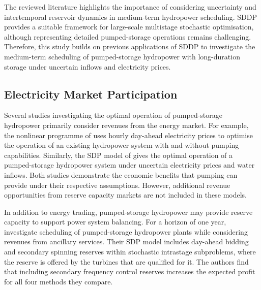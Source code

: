 
The reviewed literature highlights the importance of considering uncertainty and intertemporal reservoir dynamics in medium-term hydropower scheduling. SDDP provides a suitable framework for large-scale multistage stochastic optimisation, although representing detailed pumped-storage operations remains challenging. Therefore, this study builds on previous applications of SDDP to investigate the medium-term scheduling of pumped-storage hydropower with long-duration storage under uncertain inflows and electricity prices.


\subsection{Electricity Market Participation}

Several studies investigating the optimal operation of pumped-storage hydropower primarily consider revenues from the energy market. For example, the nonlinear programme of \textcite{ak2019} %
uses hourly day-ahead electricity prices to optimise the operation of an existing hydropower system with and without pumping capabilities. Similarly, the SDP model of \textcite{alic2023} %
gives the optimal operation of a pumped-storage hydropower system under uncertain electricity prices and water inflows. Both studies demonstrate the economic benefits that pumping can provide under their respective assumptions. However, additional revenue opportunities from reserve capacity markets are not included in these models.

In addition to energy trading, pumped-storage hydropower may provide reserve capacity to support power system balancing. For a horizon of one year, \textcite{abgottspon2014} %
investigate scheduling of pumped-storage hydropower plants while considering revenues from ancillary services. Their SDP model includes day-ahead bidding and secondary spinning reserves within stochastic intrastage subproblems, where the reserve is offered by the turbines that are qualified for it. The authors find that including secondary frequency control reserves increases the expected profit for all four methods they compare. %

